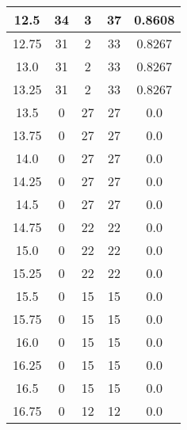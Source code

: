 \documentclass[letterpaper, 12pt]{article}
\begin{document}
\begin{longtable}{|c|c|c|c|c|}
\hline
12.5 & 34 & 3 & 37 & 0.8608 \\
\hline
12.75 & 31 & 2 & 33 & 0.8267 \\
\hline
13.0 & 31 & 2 & 33 & 0.8267 \\
\hline
13.25 & 31 & 2 & 33 & 0.8267 \\
\hline
13.5 & 0 & 27 & 27 & 0.0 \\
\hline
13.75 & 0 & 27 & 27 & 0.0 \\
\hline
14.0 & 0 & 27 & 27 & 0.0 \\
\hline
14.25 & 0 & 27 & 27 & 0.0 \\
\hline
14.5 & 0 & 27 & 27 & 0.0 \\
\hline
14.75 & 0 & 22 & 22 & 0.0 \\
\hline
15.0 & 0 & 22 & 22 & 0.0 \\
\hline
15.25 & 0 & 22 & 22 & 0.0 \\
\hline
15.5 & 0 & 15 & 15 & 0.0 \\
\hline
15.75 & 0 & 15 & 15 & 0.0 \\
\hline
16.0 & 0 & 15 & 15 & 0.0 \\
\hline
16.25 & 0 & 15 & 15 & 0.0 \\
\hline
16.5 & 0 & 15 & 15 & 0.0 \\
\hline
16.75 & 0 & 12 & 12 & 0.0 \\
\hline
\end{longtable}
\end{document}
